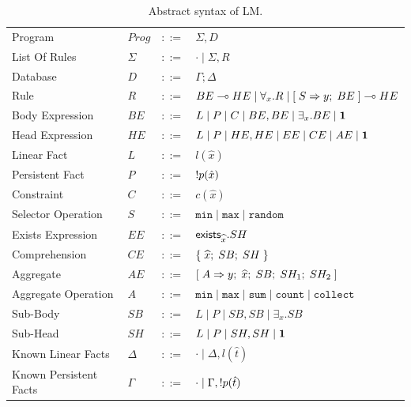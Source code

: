 \begin{table}[h]
\centering
\begin{tabular}{ l l c l }
  Program & $Prog$ & $::=$ & $\Sigma, D$ \\
  List Of Rules & $\Sigma$ & $::=$ & $\cdot \; | \; \Sigma, R$\\
  Database & $D$ & $::=$ & $\Gamma; \Delta$ \\
  Rule & $R$ & $::=$ & $BE \multimap HE \; | \; \forall_{x}. R \; | \; [\; S \Rightarrow y; \; BE \;] \multimap HE$ \\
  Body Expression & $BE$ & $::=$ & $L \; | \; P \; | \; C \; | \; BE, BE \; | \;
\exists_{x}. BE \; | \; \mathbf{1}$\\
  Head Expression & $HE$ & $::=$ & $L \; | \; P \; | \; HE, HE \; | \; EE \; |
  \; CE \; | \; AE \; | \; \mathbf{1}$\\
  
  Linear Fact & $L$ & $::=$ & $l(\hat{x})$\\
  Persistent Fact & $P$ & $::=$ & ${!} p(\hat{x})$\\
  Constraint & $C$ & $::=$ & $c(\hat{x})$ \\
  Selector Operation & $S$ & $::=$ & $\mathtt{min} \; | \; \mathtt{max} \; | \; \mathtt{random}$\\
  
  Exists Expression & $EE$ & $::=$ & $\mathsf{exists}_{\widehat{x}}. SH$ \\
  Comprehension & $CE$ & $::=$ & $\{ \; \widehat{x}; \; SB; \; SH \; \}$ \\

  Aggregate & $AE$ & $::=$ & $[\; A \Rightarrow y; \; \widehat{x}; \; SB; \; SH_1; \; SH_2 \;]$ \\
  Aggregate Operation & $A$ & $::=$ & $\mathtt{min} \; | \; \mathtt{max} \; | \;
\mathtt{sum} \; | \; \mathtt{count} \; | \; \mathtt{collect}$ \\
  
  Sub-Body & $SB$ & $::=$ & $L \; | \; P \; | \; SB, SB \; | \; \exists_{x}. SB$\\
  Sub-Head & $SH$ & $::=$ & $L \; | \; P \; | \; SH, SH \; | \; \mathbf{1}$\\
  
  Known Linear Facts & $\Delta$ & $::=$ & $\cdot \; | \; \Delta, l(\hat{t})$ \\
  Known Persistent Facts & $\Gamma$ & $::=$ & $\cdot \; | \; \Gamma, {!} p(\hat{t})$ \\
\end{tabular}
\caption{Abstract syntax of LM.}\label{tbl:ast}
\end{table}

